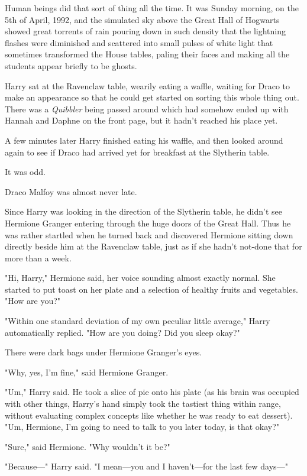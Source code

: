 Human beings did that sort of thing all the time.
\later
It was Sunday morning, on the 5th of April, 1992, and the simulated sky above
the Great Hall of Hogwarts showed great torrents of rain pouring down in such
density that the lightning flashes were diminished and scattered into small
pulses of white light that sometimes transformed the House tables, paling their
faces and making all the students appear briefly to be ghosts.

Harry sat at the Ravenclaw table, wearily eating a waffle, waiting for Draco to
make an appearance so that he could get started on sorting this whole thing
out. There was a \emph{Quibbler} being passed around which had somehow ended up
with Hannah and Daphne on the front page, but it hadn't reached his place yet.

A few minutes later Harry finished eating his waffle, and then looked around
again to see if Draco had arrived yet for breakfast at the Slytherin table.

It was odd.

Draco Malfoy was almost never late.

Since Harry was looking in the direction of the Slytherin table, he didn't see
Hermione Granger entering through the huge doors of the Great Hall. Thus he was
rather startled when he turned back and discovered Hermione sitting down
directly beside him at the Ravenclaw table, just as if she hadn't not-done that
for more than a week.

"Hi, Harry," Hermione said, her voice sounding almost exactly normal. She
started to put toast on her plate and a selection of healthy fruits and
vegetables. "How are you?"

"Within one standard deviation of my own peculiar little average," Harry
automatically replied. "How are you doing? Did you sleep okay?"

There were dark bags under Hermione Granger's eyes.

"Why, yes, I'm fine," said Hermione Granger.

"Um," Harry said. He took a slice of pie onto his plate (as his brain was
occupied with other things, Harry's hand simply took the tastiest thing within
range, without evaluating complex concepts like whether he was ready to eat
dessert). "Um, Hermione, I'm going to need to talk to you later today, is that
okay?"

"Sure," said Hermione. "Why wouldn't it be?"

"Because---" Harry said. "I mean---you and I haven't---for the last few days---"

